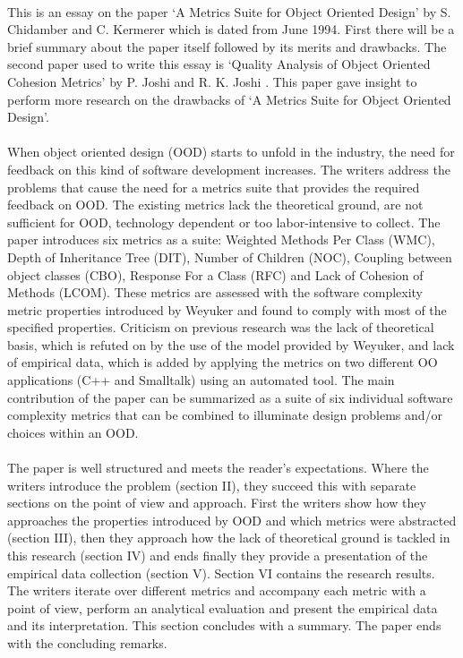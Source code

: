 \paragraph{}
This is an essay on the paper `A Metrics Suite for Object Oriented Design' \autocite{METRICS_SUITE} by S. Chidamber and C.
Kermerer which is dated from June 1994. First there will be a brief summary about the paper itself followed by
its merits and drawbacks. The second paper used to write this essay is
`Quality Analysis of Object Oriented Cohesion Metrics' by P. Joshi and R. K. Joshi \autocite{JOSHI}.
This paper gave insight to perform more research on the drawbacks of `A Metrics Suite for Object Oriented Design'.

\paragraph{}
When object oriented design (OOD) starts to unfold in the industry, the need for feedback on this kind of software
development increases. The writers address the problems that cause the need for a metrics suite that provides the
required feedback on OOD. The existing metrics lack the theoretical ground, are not sufficient for OOD,
technology dependent or too labor-intensive to collect.
The paper introduces six metrics as a suite: Weighted Methods Per Class (WMC), Depth of Inheritance Tree (DIT),
Number of Children (NOC), Coupling between object classes (CBO), Response For a Class (RFC) and Lack of
Cohesion of Methods (LCOM). These metrics are assessed with the software complexity metric properties introduced by
Weyuker \autocite{WEYUKER} and found to comply with most of the specified properties.
Criticism on previous research was the lack of theoretical basis, which is refuted on by the use of the
model provided by Weyuker, and lack of empirical data, which is added by applying the metrics on two different OO
applications (C++ and Smalltalk) using an automated tool. The main contribution of the paper can be summarized as a
suite of six individual software complexity metrics that can be combined to illuminate design problems and/or choices
within an OOD.

\paragraph{}
The paper is well structured and meets the reader's expectations. Where the writers introduce the problem
(section II), they succeed this with separate sections on the point of view and approach. First the writers show how they
approaches the properties introduced by OOD and which metrics were abstracted (section III), then they approach how the
lack of theoretical ground is tackled in this research (section IV) and ends finally they provide a presentation of the empirical
data collection (section V). Section VI contains the research results. The writers iterate over different metrics and
accompany each metric with a point of view, perform an analytical evaluation and present the empirical data and its
interpretation. This section concludes with a summary. The paper ends with the concluding remarks.

